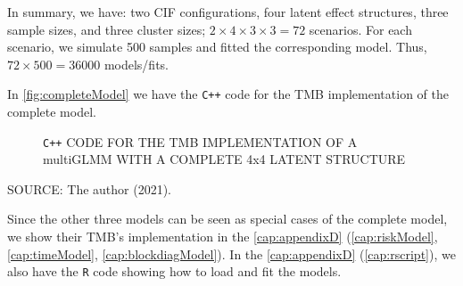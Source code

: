 In summary, we have: two CIF configurations, four latent effect
structures, three sample sizes, and three cluster sizes; \(2 \times
4 \times 3 \times 3 = 72\) scenarios. For each scenario, we simulate 500
samples and fitted the corresponding model. Thus, \(72 \times 500 =
36000\) models/fits.

In \autoref{fig:completeModel} we have the \texttt{C++} code for the TMB
implementation of the complete model.

\begin{figure}[H]
 \setlength{\abovecaptionskip}{.0001pt}
 \caption{\texttt{C++} CODE FOR THE TMB IMPLEMENTATION OF A multiGLMM
          WITH A COMPLETE 4x4 LATENT STRUCTURE}
 \vspace{-0.4cm}
 \label{fig:completeModel}
\end{figure}


\vspace{-0.5cm}
\begin{center}
 \begin{footnotesize}
  SOURCE: The author (2021).
 \end{footnotesize}
\end{center}

Since the other three models can be seen as special cases of the
complete model, we show their TMB's implementation in
the \autoref{cap:appendixD} (\autoref{cap:riskModel},
\autoref{cap:timeModel}, \autoref{cap:blockdiagModel}). In the
\autoref{cap:appendixD} (\autoref{cap:rscript}), we also have the
\texttt{R} code showing how to load and fit the models.

